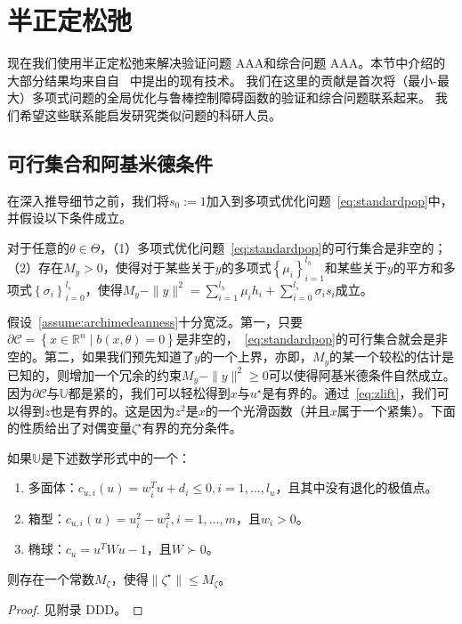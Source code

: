 
\chapter{半正定松弛}
\label{sec:sdprelax}

现在我们使用半正定松弛来解决验证问题{\color{red} AAA}和综合问题{\color{red} AAA}。本节中介绍的大部分结果均来自自~\cite{lasserre01siopt-global,lasserre11jgo-minmaxpop} 中提出的现有技术。 我们在这里的贡献是首次将（最小-最大）多项式问题的全局优化与鲁棒控制障碍函数的验证和综合问题联系起来。 我们希望这些联系能启发研究类似问题的科研人员。

\section{可行集合和阿基米德条件}
在深入推导细节之前，我们将$s_0 := 1$加入到多项式优化问题~\eqref{eq:standardpop}中，并假设以下条件成立。
\begin{assumption}[可行性和阿基米德条件]\label{assume:archimedeanness}
    对于任意的$\theta \in \Theta$，（1）多项式优化问题~\eqref{eq:standardpop}的可行集合是非空的；（2）存在$M_y > 0$，使得对于某些关于$y$的多项式$\left\{ \mu_i \right\}_{i=1}^{l_h}$和某些关于$y$的平方和多项式$\left\{ \sigma_i \right\}_{i=0}^{l_s}$，使得$M_y - \parallel y \parallel^2 = \sum_{i=1}^{l_h} \mu_i h_i + \sum_{i=0}^{l_s} \sigma_i s_i$成立。
\end{assumption}

假设~\ref{assume:archimedeanness}十分宽泛。第一，只要$\partial \mathcal{C} = \left\{ x \in \mathbb{R}^n \mid b(x, \theta) = 0 \right\}$是非空的，~\eqref{eq:standardpop}的可行集合就会是非空的。第二，如果我们预先知道了$y$的一个上界，亦即，$M_y$的某一个较松的估计是已知的，则增加一个冗余的约束$M_y - \parallel y \parallel^2 \ge 0$可以使得阿基米德条件自然成立。因为$\partial \mathcal{C}$与$\mathbb{U}$都是紧的，我们可以轻松得到$x$与$u^\star$是有界的。通过~\eqref{eq:zlift}，我们可以得到$z$也是有界的。这是因为$z^2$是$x$的一个光滑函数（并且$x$属于一个紧集）。下面的性质给出了对偶变量$\zeta^\star$有界的充分条件。

\begin{proposition}\label{prop:boundeddual}
    如果$\mathbb{U}$是下述数学形式中的一个：
    \begin{enumerate}
        \item 多面体：$c_{u,i}(u) = w_i^T u + d_i \le 0, i = 1, \dots, l_u$，且其中没有退化的极值点。
        \item 箱型：$c_{u,i}(u) = u_i^2 - w_i^2, i = 1, \dots, m$，且$w_i > 0$。
        \item 椭球：$c_u = u^T W u - 1$，且$W \succ 0$。
    \end{enumerate}
    则存在一个常数$M_\zeta$，使得$\parallel \zeta^\star \parallel \le M_\zeta$。
\end{proposition}
\begin{proof}
    见附录{\color{red} DDD}。
\end{proof}

